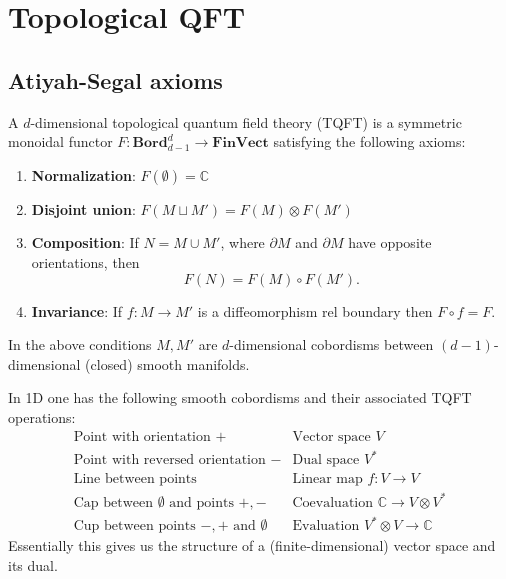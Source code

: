 \section{Topological QFT}
\subsection{Atiyah-Segal axioms}

    \begin{axiom}
        A $d$-dimensional topological quantum field theory (TQFT) is a symmetric monoidal functor $F:\textbf{Bord}_{d-1}^d\rightarrow\textbf{FinVect}$ satisfying the following axioms:
        \begin{enumerate}
            \item \textbf{Normalization}: $F(\emptyset)=\mathbb{C}$
            \item \textbf{Disjoint union}: $F(M\sqcup M') = F(M)\otimes F(M')$
            \item \textbf{Composition}: If $N=M\cup M'$, where $\partial M$ and $\partial M$ have opposite orientations, then \[F(N) = F(M)\circ F(M').\]
            \item \textbf{Invariance}: If $f: M\rightarrow M'$ is a diffeomorphism rel boundary then $F\circ f = F$.
        \end{enumerate}
        In the above conditions $M, M'$ are $d$-dimensional cobordisms between $(d-1)$-dimensional (closed) smooth manifolds.
    \end{axiom}

    \begin{example}[1D]
        In 1D one has the following smooth cobordisms and their associated TQFT operations:
        \begin{equation*}
            \begin{array}{l|l}
                \text{Point with orientation } + & \text{Vector space } V\\
                \text{Point with reversed orientation } - & \text{Dual space } V^*\\
                \text{Line between points} & \text{Linear map } f:V\rightarrow V\\
                \text{Cap between $\emptyset$ and points } +, - & \text{Coevaluation } \mathbb{C}\rightarrow V\otimes V^*\\
                \text{Cup between points $-, +$ and }\emptyset & \text{Evaluation } V^*\otimes V\rightarrow\mathbb{C}
            \end{array}
        \end{equation*}
        Essentially this gives us the structure of a (finite-dimensional) vector space and its dual.
    \end{example}

